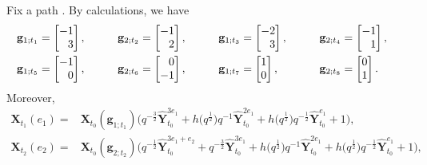 \documentclass[10pt,a4paper]{amsart}
\numberwithin{equation}{section}
\begin{document}
\begin{Example}[type $G_{2}$]
Fix a path .
By calculations, we have
\begin{alignat*}{5}
 &\mathbf{g}_{1;t_{1}}=\begin{bmatrix}
 -1\\\hphantom{-}3
 \end{bmatrix}, \qquad&&
 \mathbf{g}_{2;t_{2}}=\begin{bmatrix}
 -1\\\hphantom{-}2
 \end{bmatrix},\qquad&&
 \mathbf{g}_{1;t_{3}}=\begin{bmatrix}
 -2\\\hphantom{-}3
 \end{bmatrix},\qquad&&
  \mathbf{g}_{2;t_{4}}=\begin{bmatrix}
 -1\\\hphantom{-}1
 \end{bmatrix},&\\
 &\mathbf{g}_{1;t_{5}}=\begin{bmatrix}
 -1\\\hphantom{-}0
 \end{bmatrix},\qquad&&
 \mathbf{g}_{2;t_{6}}=\begin{bmatrix}
 \hphantom{-}0\\-1
 \end{bmatrix},\qquad&&
 \mathbf{g}_{1;t_{7}}=\begin{bmatrix}
 1\\0
 \end{bmatrix},\qquad&&
 \mathbf{g}_{2;t_{8}}=\begin{bmatrix}
 0\\1
 \end{bmatrix}.&
 \end{alignat*}
Moreover,
\begin{align*}
 \mathbf{X}_{t_{1}}(e_{1})={}&\mathbf{X}_{t_{0}}(\mathbf{g}_{1;t_1})\bigl(q^{-\frac{3}{2}}\mathbf{\hat{Y}}_{t_0}^{3e_1}+h\bigl(q^{\frac{1}{2}}\bigr)q^{-1}
 \mathbf{\hat{Y}}_{t_0}^{2e_1}+h\bigl(q^{\frac{1}{2}}\bigr)q^{-\frac{1}{2}}\mathbf{\hat{Y}}_{t_0}^{e_1}+1\bigr),\\
 \mathbf{X}_{t_2}(e_2)={}&\mathbf{X}_{t_0}(\mathbf{g}_{2;t_2})\bigl(q^{-\frac{1}{2}}\mathbf{\hat{Y}}_{t_0}^{3e_1+e_2}+q^{-\frac{3}{2}}\mathbf{\hat{Y}}_{t_0}^{3e_1}
 +h\bigl(q^{\frac{1}{2}}\bigr)q^{-1}\mathbf{\hat{Y}}_{t_0}^{2e_1}+h\bigl(q^{\frac{1}{2}}\bigr)q^{-\frac{1}{2}}\mathbf{\hat{Y}}_{t_0}^{e_1}+1\bigr),\\

\end{align*}
\end{Example}
\end{document}
